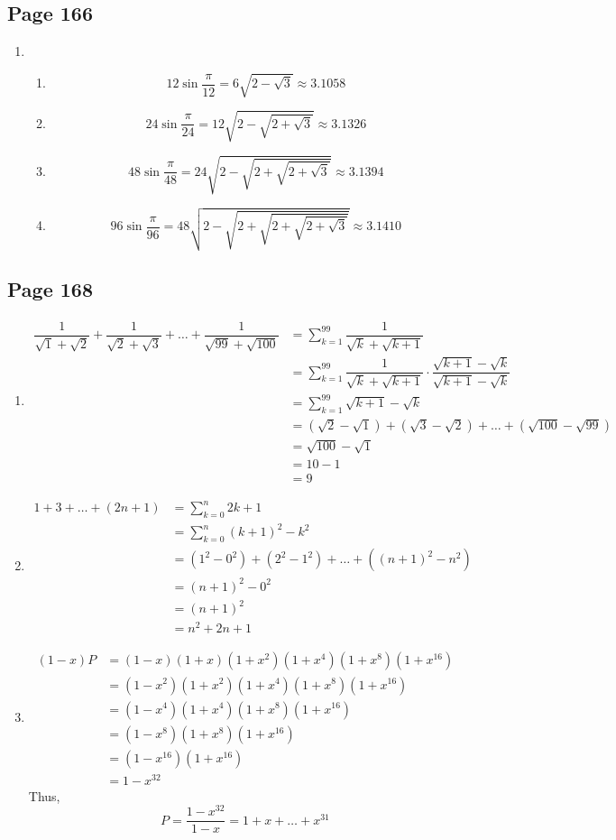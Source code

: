 \documentclass{article}
\newenvironment{solutions}[1]
{\subsection*{#1}
 \begin{enumerate}[leftmargin=1.5em]}
{\end{enumerate}}
\newcommand{\solution}{\item}
\newenvironment{subsolutions}
{\begin{enumerate}}
{\end{enumerate}}
\newcommand{\subsolution}{\item}
\begin{document}
\begin{solutions}{Page 166}
\solution %
\begin{subsolutions}
\subsolution %
\[
12\sin{\dfrac{\pi}{12}} = 6\sqrt{2-\sqrt{3}}\approx 3.1058
\]
\subsolution %
\[
24\sin{\dfrac{\pi}{24}} = 12\sqrt{2-\sqrt{2+\sqrt{3}}}  \approx 3.1326
\]
\subsolution %
\[
48\sin{\dfrac{\pi}{48}} = 24\sqrt{2-\sqrt{2+\sqrt{2+\sqrt{3}}}} \approx 3.1394
\]
\subsolution %
\[
96\sin{\dfrac{\pi}{96}} = 48\sqrt{2-\sqrt{2+\sqrt{2+\sqrt{2+\sqrt{3}}}}} \approx 3.1410
\]
\end{subsolutions}

\end{solutions}

\begin{solutions}{Page 168}
\solution %
\begin{align*}
\dfrac{1}{\sqrt{1}+\sqrt{2}} + \dfrac{1}{\sqrt{2}+\sqrt{3}} + \ldots + \dfrac{1}{\sqrt{99}+\sqrt{100}} &= \sum_{k=1}^{99} {\dfrac{1}{\sqrt{k} + \sqrt{k+1}}} \\
&= \sum_{k=1}^{99} {\dfrac{1}{\sqrt{k} + \sqrt{k+1}} \cdot \dfrac{\sqrt{k+1} - \sqrt{k}}{\sqrt{k+1} - \sqrt{k}}} \\
&= \sum_{k=1}^{99} {\sqrt{k+1}-\sqrt{k}} \\
&= \left(\sqrt{2}-\sqrt{1}\right) + \left(\sqrt{3}-\sqrt{2}\right) + \ldots + \left(\sqrt{100}-\sqrt{99}\right) \\
&= \sqrt{100} - \sqrt{1} \\
&= 10 - 1 \\
&= 9
\end{align*}

\solution %
\begin{align*}
1 + 3 + \ldots + \left(2n+1\right) &= \sum_{k=0}^{n} {2k+1} \\
&= \sum_{k=0}^{n} {\left(k+1\right)^{2}-k^{2}} \\
&= \left(1^{2} - 0^{2}\right) + \left(2^{2} - 1^{2}\right) + \ldots + \left( (n+1)^{2} - n^{2} \right) \\
&= \left(n+1\right)^{2} - 0^{2} \\
&= \left(n+1\right)^{2} \\
&= n^{2} + 2n + 1
\end{align*}

\solution %
\begin{align*}
\left(1-x\right)P &= \left(1-x\right)\left(1+x\right)\left(1+x^{2}\right)\left(1+x^{4}\right)\left(1+x^{8}\right)\left(1+x^{16}\right) \\
&= \left(1-x^{2}\right)\left(1+x^{2}\right)\left(1+x^{4}\right)\left(1+x^{8}\right)\left(1+x^{16}\right) \\
&= \left(1-x^{4}\right)\left(1+x^{4}\right)\left(1+x^{8}\right)\left(1+x^{16}\right) \\
&= \left(1-x^{8}\right)\left(1+x^{8}\right)\left(1+x^{16}\right) \\
&= \left(1-x^{16}\right)\left(1+x^{16}\right) \\
&= 1-x^{32}
\end{align*}
Thus,
\[
P = \dfrac{1-x^{32}}{1-x} = 1 + x + \ldots + x^{31}
\]


\end{solutions}
\end{document}
